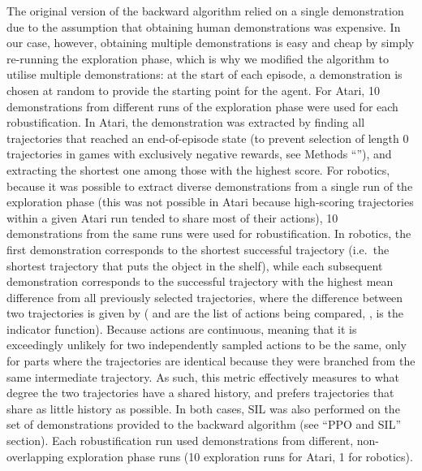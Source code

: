 \documentclass{nature}
\begin{document}
The original version of the backward algorithm relied on a single demonstration due to the assumption that obtaining human demonstrations was expensive.
In our case, however, obtaining multiple demonstrations is easy and cheap by simply re-running the exploration phase, which is why we modified the algorithm to utilise multiple demonstrations: at the start of each episode, a demonstration is chosen at random to provide the starting point for the agent.
For Atari, 10 demonstrations from different runs of the exploration phase were used for each robustification. 
In Atari, the demonstration was extracted by finding all trajectories that reached an end-of-episode state (to prevent selection of length 0 trajectories in games with exclusively negative rewards, see Methods ``''), and extracting the shortest one among those with the highest score.
For robotics, because it was possible to extract diverse demonstrations from a single run of the exploration phase (this was not possible in Atari because high-scoring trajectories within a given Atari run tended to share most of their actions), 10 demonstrations from the same runs were used for robustification. In robotics, the first demonstration corresponds to the shortest successful trajectory (i.e.~the shortest trajectory that puts the object in the shelf), while each subsequent demonstration corresponds to the successful trajectory with the highest mean difference from all previously selected trajectories, where the difference between two trajectories is given by  ( and  are the list of actions being compared, ,  is the indicator function). 
Because actions are continuous, meaning that it is exceedingly unlikely for two independently sampled actions to be the same,  only for parts where the trajectories are identical because they were branched from the same intermediate trajectory.
As such, this metric effectively measures to what degree the two trajectories have a shared history, and prefers trajectories that share as little history as possible.
In both cases, SIL was also performed on the set of demonstrations provided to the backward algorithm (see ``PPO and SIL'' section).
Each robustification run used demonstrations from different, non-overlapping exploration phase runs (10 exploration runs for Atari, 1 for robotics).
\end{document}
